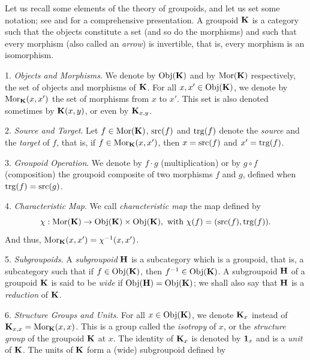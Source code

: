 \begin{article}
  \label{The-category-of-groupoids}
  Let us recall some elements of the theory of groupoids,
  and let us set some notation;
  see \cite{McL75} and \cite{McK87} for a comprehensive presentation.
  A groupoid ${\mathbf K}$ is a category such that the objects constitute a set (and so do the morphisms) and such that every morphism (also called an {\em arrow}) is invertible,
  that is,
  every morphism is an isomorphism.
  
  1. {\em Objects and Morphisms}.
  We denote by ${\operatorname{Obj}}({\mathbf K})$ and by ${\operatorname{Mor}}({\mathbf K})$ respectively,
  the set of objects and morphisms of $\bf K$.
  For all $x, x' \in {\operatorname{Obj}}({\mathbf K})$,
  we denote by  ${\operatorname{Mor}}_{\mathbf K}(x,x')$ the set of morphisms from $x$ to $x'$.
  This set is also denoted sometimes by ${\mathbf K}(x,y)$,
  or even by ${\mathbf K}_{x,y}$.
  
  2. {\em Source and Target}.
  Let $f \in {\operatorname{Mor}}({\mathbf K})$,
  ${\operatorname{src}}(f)$ and ${\operatorname{trg}}(f)$ denote the {\em source} and the {\em target} of $f$,
  that is,
  if $f \in {\operatorname{Mor}}_{\mathbf K}(x,x')$,
  then $x = {\operatorname{src}}(f)$ and $x' = {\operatorname{trg}}(f)$.
  
  3. {\em Groupoid Operation}.
  We denote by $f \cdot g$ (multiplication) or by $g \circ f$ (composition) the groupoid composite of two morphisms $f$ and $g$,
  defined when ${\operatorname{trg}}(f) = {\operatorname{src}}(g)$.
  
  4. {\em Characteristic Map}.
  We call {\em characteristic map} the map defined by
  $$%
  \car : \Mor(\KK) \to \Obj(\KK) \times \Obj(\KK), \text{ with } \car(f)=(\source(f),\target(f)).
  $$%
  And thus,
  ${\operatorname{Mor}}_{\mathbf K}(x,x') = \chi^{-1}(x,x')$.
  
  5. {\em Subgroupoids}.
  A {\em subgroupoid} ${\mathbf H}$ is a subcategory which is a groupoid,
  that is,
  a
  subcategory such that if $f \in {\operatorname{Obj}}({\mathbf K})$,
  then $f^{-1} \in {\operatorname{Obj}}({\mathbf K})$.
  A subgroupoid ${\mathbf H}$ of a groupoid ${\mathbf K}$ is said to be {\em wide} if ${\operatorname{Obj}}({\mathbf H}) = {\operatorname{Obj}}({\mathbf K})$;
  we shall also say that ${\mathbf H}$ is a {\em reduction} of ${\mathbf K}$.
  
  6. {\em Structure Groups and Units}.
  For all $x \in {\operatorname{Obj}}({\mathbf K})$,
  we denote ${\mathbf K}_x$ instead of ${\mathbf K}_{x,x} = {\operatorname{Mor}}_{\mathbf K}(x,x)$.
  This is a group called the {\em isotropy} of $x$,
  or the {\em structure group} of the groupoid ${\mathbf K}$ at $x$.
  The identity of ${\mathbf K}_x$ is denoted by ${\bf 1}_x$ and is a {\em unit} of ${\mathbf K}$.
  The units of ${\mathbf K}$ form a (wide) subgroupoid defined by
  

\end{article}

